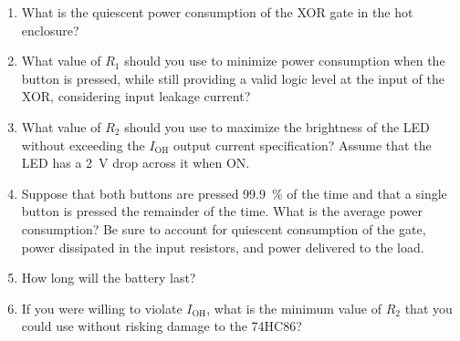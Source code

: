 \documentclass{e85}
\begin{document}
\begin{enumerate}
\begin{center}

  \end{center}
  \begin{enumerate}
  \item What is the quiescent power consumption of the XOR gate in the
    hot enclosure?
    \begin{solution}
    \end{solution}
  \item What value of \(R_1\) should you use to minimize power
    consumption when the button is pressed, while still providing a
    valid logic level at the input of the XOR, considering input
    leakage current?
    \begin{solution}
    \end{solution}
  \item What value of \(R_2\) should you use to maximize the
    brightness of the LED without exceeding the \(I_\mathrm{OH}\)
    output current specification?  Assume that the LED has a
    \SI{2}{\V} drop across it when ON.
    \begin{solution}
    \end{solution}
  \item Suppose that both buttons are pressed \SI{99.9}{\percent} of
    the time and that a single button is pressed the remainder of the
    time.  What is the average power consumption?  Be sure to account
    for quiescent consumption of the gate, power dissipated in the
    input resistors, and power delivered to the load.
    \begin{solution}
    \end{solution}
  \item How long will the battery last?
    \begin{solution}
    \end{solution}
  \item If you were willing to violate \(I_\mathrm{OH}\), what is the
    minimum value of \(R_2\) that you could use without risking damage
    to the 74HC86?
    \begin{solution}
    \end{solution}
  \end{enumerate}


\end{enumerate}
\end{document}
